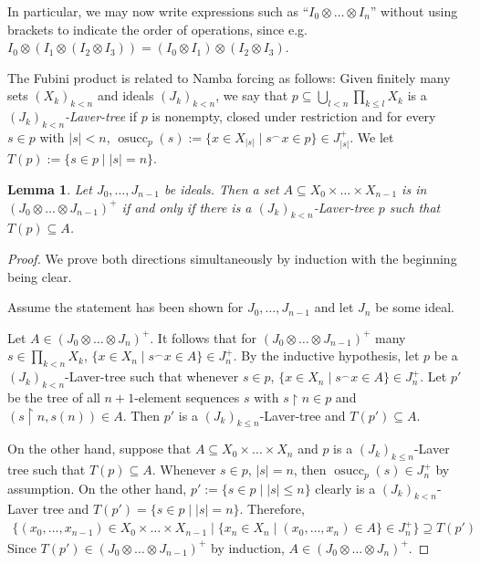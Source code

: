 \documentclass[a4paper]{amsart}
\theoremstyle{definition}
\theoremstyle{remark}
\theoremstyle{plain}
\newtheorem{mylem}[mydef]{Lemma}
\numberwithin{mydef}{section}
\DeclareMathOperator{\osucc}{osucc}
\newcommand{\uhr}{\upharpoonright}
\begin{document}
	In particular, we may now write expressions such as ``$I_0\otimes\dots\otimes I_n$'' without using brackets to indicate the order of operations, since e.g. $I_0\otimes(I_1\otimes (I_2\otimes I_3))=(I_0\otimes I_1)\otimes (I_2\otimes I_3)$.
	
	The Fubini product is related to Namba forcing as follows: Given finitely many sets $(X_k)_{k<n}$ and ideals $(J_k)_{k<n}$, we say that $p\subseteq\bigcup_{l<n}\prod_{k\leq l}X_k$ is a \emph{$(J_k)_{k<n}$-Laver-tree} if $p$ is nonempty, closed under restriction and for every $s\in p$ with $|s|<n$, $\osucc_p(s):=\{x\in X_{|s|}\;|\;s^{\frown}x\in p\}\in J_{|s|}^+$. We let $T(p):=\{s\in p\;|\;|s|=n\}$.
	
	\begin{mylem}\label{ProductTree}
		Let $J_0,\dots,J_{n-1}$ be ideals. Then a set $A\subseteq X_0\times\dots\times X_{n-1}$ is in $(J_0\otimes\dots\otimes J_{n-1})^+$ if and only if there is a $(J_k)_{k<n}$-Laver-tree $p$ such that $T(p)\subseteq A$.
	\end{mylem}
	
	\begin{proof}
		We prove both directions simultaneously by induction with the beginning being clear.
		
		Assume the statement has been shown for $J_0,\dots,J_{n-1}$ and let $J_n$ be some ideal.
		
		Let $A\in(J_0\otimes\dots\otimes J_n)^+$. It follows that for $(J_0\otimes\dots\otimes J_{n-1})^+$ many $s\in\prod_{k<n}X_k$, $\{x\in X_n\;|\;s^{\frown}x\in A\}\in J_n^+$. By the inductive hypothesis, let $p$ be a $(J_k)_{k<n}$-Laver-tree such that whenever $s\in p$, $\{x\in X_n\;|\;s^{\frown}x\in A\}\in J_n^+$. Let $p'$ be the tree of all $n+1$-element sequences $s$ with $s\uhr n\in p$ and $(s\uhr n,s(n))\in A$. Then $p'$ is a $(J_k)_{k\leq n}$-Laver-tree and $T(p')\subseteq A$.
		
		On the other hand, suppose that $A\subseteq X_0\times\dots\times X_n$ and $p$ is a $(J_k)_{k\leq n}$-Laver tree such that $T(p)\subseteq A$. Whenever $s\in p$, $|s|=n$, then $\osucc_p(s)\in J_n^+$ by assumption. On the other hand, $p':=\{s\in p\;|\;|s|\leq n\}$ clearly is a $(J_k)_{k<n}$-Laver tree and $T(p')=\{s\in p\;|\;|s|=n\}$. Therefore,
		\begin{align*}
			\{(x_0,\dots,x_{n-1})\in X_0\times\dots\times X_{n-1}\;|\;\{x_n\in X_n\;|\;(x_0,\dots,x_n)\in A\}\in J_n^+\}
			\supseteq T(p')
		\end{align*}
		Since $T(p')\in (J_0\otimes\dots\otimes J_{n-1})^+$ by induction, $A\in (J_0\otimes\dots\otimes J_n)^+$.
	\end{proof}
	
\end{document}
